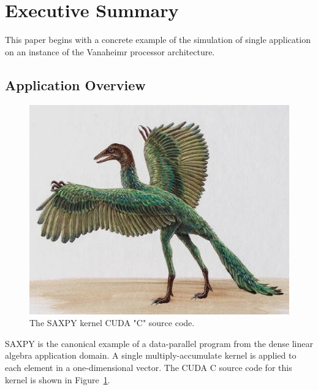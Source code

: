 \documentclass[conference, 10pt]{IEEEtran}
\begin{document}

\section{Executive Summary}
\label{sec:summary}

This paper begins with a concrete example of the simulation of single
application on an instance of the Vanaheimr processor architecture.  

\subsection{Application Overview}

\begin{figure}
	\begin{center}
		\includegraphics[width=0.9\linewidth]{archaeopteryx-bird}
		\caption{The SAXPY kernel CUDA "C" source code.}
		\label{fig:saxpy-kernel-source}
	\end{center}
\end{figure}

SAXPY is the canonical example of a data-parallel program from the dense linear
algebra application domain.  A single multiply-accumulate kernel is applied to
each element in a one-dimensional vector.  The CUDA C source code for this
kernel is shown in Figure~\ref{fig:saxpy-kernel-source}.
\end{document}
